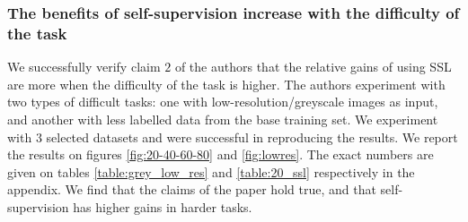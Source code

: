 \begin{table*}[hbt!]
  \begin{center}
\end{center}
\caption{ResNet-18's performance on the $5$ small datasets.}
\label{table:resnet_few_shot}
\end{table*}

\subsubsection{The benefits of self-supervision increase with the difficulty of the task}

We successfully verify claim $2$ of the authors that the relative gains of using SSL are more when the difficulty of the task is higher. The authors experiment with two types of difficult tasks: one with low-resolution/greyscale images as input, and another with less labelled data from the base training set. We experiment with $3$ selected datasets and were successful in reproducing the results. We report the results on figures \ref{fig:20-40-60-80} and \ref{fig:lowres}. The exact numbers are given on tables \ref{table:grey_low_res} and \ref{table:20_ssl} respectively in the appendix. We find that the claims of the paper hold true, and that self-supervision has higher gains in harder tasks.

